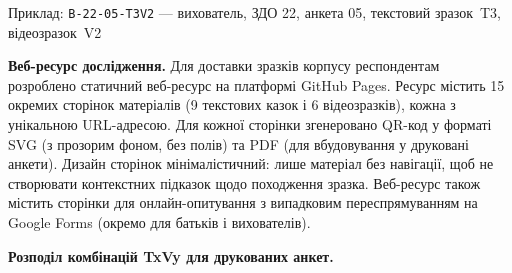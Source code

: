 \documentclass[14pt, a4paper]{extreport}
\begin{document}
\vspace{10pt}
\begin{center}

\vspace{6pt}
{\small Приклад: \texttt{В-22-05-T3V2} --- вихователь, ЗДО\,\textnumero\,22, анкета\,\textnumero\,05, текстовий зразок~T3, відеозразок~V2}
\end{center}

\vspace{8pt}
\textbf{Веб-ресурс дослідження.}
Для доставки зразків корпусу респондентам розроблено статичний веб-ресурс на платформі GitHub Pages. Ресурс містить 15 окремих сторінок матеріалів (9 текстових казок і 6 відеозразків), кожна з унікальною URL-адресою. Для кожної сторінки згенеровано QR-код у форматі SVG (з прозорим фоном, без полів) та PDF (для вбудовування у друковані анкети). Дизайн сторінок мінімалістичний: лише матеріал без навігації, щоб не створювати контекстних підказок щодо походження зразка. Веб-ресурс також містить сторінки для онлайн-опитування з випадковим переспрямуванням на Google Forms (окремо для батьків і вихователів).

\vspace{8pt}
\textbf{Розподіл комбінацій TxVy для друкованих анкет.}
\end{document}
